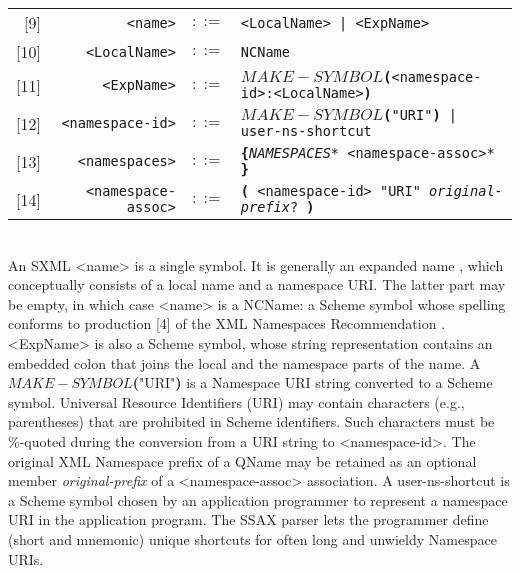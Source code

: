 \documentclass[10pt]{article}
\begin{document}
\begin{tabular}{rrcp{2.8in}}
{[}9{]} & \texttt{<name>} &  $::=$ & \texttt{<LocalName> | <ExpName> } \\
{[}10{]} & \texttt{<LocalName>} &  $::=$ & \texttt{NCName } \\
{[}11{]} & \texttt{<ExpName>} &  $::=$ & \texttt{\textbf{$MAKE{-}SYMBOL$(}<namespace-id>:<LocalName>\textbf{)} } \\
{[}12{]} & \texttt{<namespace-id>} &  $::=$ & \texttt{\textbf{$MAKE{-}SYMBOL$(}"URI"\textbf{)} | user-ns-shortcut } \\
{[}13{]} & \texttt{<namespaces>} &  $::=$ & \texttt{\texttt{\textbf{\{}}{\itshape *NAMESPACES*} <namespace-assoc>*\texttt{ \textbf{\}}} } \\
{[}14{]} & \texttt{<namespace-assoc>} &  $::=$ & \texttt{\textbf{(} <namespace-id> "URI" {\itshape original-prefix}? \textbf{)} } \\
\end{tabular}
\\
An SXML <name> is a single symbol. It is
generally an expanded name \cite{XML-Namespaces}, which
conceptually consists of a local name and a namespace URI. The latter
part may be empty, in which case <name> is a NCName: a Scheme symbol whose spelling conforms to production [4]
of the XML Namespaces Recommendation \cite{XML-Namespaces}.
<ExpName> is also a Scheme symbol, whose string
representation contains an embedded colon that joins the local and the
namespace parts of the name. A \textbf{$MAKE{-}SYMBOL$(}"URI"\textbf{)} is a
Namespace URI string converted to a Scheme symbol. Universal Resource
Identifiers (URI) may contain characters (e.g., parentheses) that are
prohibited in Scheme identifiers. Such characters must be \%-quoted
during the conversion from a URI string to <namespace-id>. The original XML Namespace prefix of a QName \cite{XML-Namespaces} 
may be retained as an optional member {\itshape original-prefix} of a <namespace-assoc>
association. A user-ns-shortcut is a Scheme
symbol chosen by an application programmer to represent a namespace
URI in the application program. The SSAX parser lets the programmer
define (short and mnemonic) unique shortcuts for often long and unwieldy
Namespace URIs.
\end{document}
